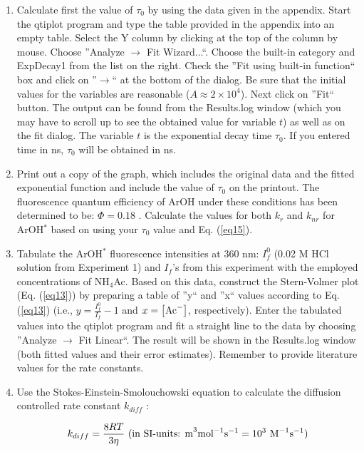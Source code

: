 \documentclass[byrevtex,amssymb,aps,pra,floatfix,letterpaper]{revtex4}
\begin{document}
\begin{enumerate}

\item Calculate first the value of $\tau_0$ by using the data given in the appendix. Start the qtiplot program and type the table provided in the appendix into an empty table. Select the Y column by clicking at the top of the column by mouse. Choose ''Analyze $\rightarrow$ Fit Wizard...``. Choose the built-in category and ExpDecay1 from the list on the right. Check the ''Fit using built-in function`` box and click on ''$\rightarrow$`` at the bottom of the dialog. Be sure that the initial values for the variables are reasonable ($A \approx 2\times 10^4$). Next click on ''Fit`` button. The output can be found from the Results.log window (which you may have to scroll up to see the obtained value for variable $t$) as well as on the fit dialog. The variable $t$ is the exponential decay time $\tau_0$. If you entered time in ns, $\tau_0$  will be obtained in ns.

\item Print out a copy of the graph, which includes the original data and the fitted exponential function and include the value of $\tau_0$ on the printout. The fluorescence quantum efficiency of ArOH under these conditions has been determined to be: $\Phi = 0.18$ \cite{MCBANE}. Calculate the values for both $k_r$ and $k_{nr}$ for ArOH$^*$ based on using your $\tau_0$ value and Eq. (\ref{eq15}).

\item Tabulate the ArOH$^*$ fluorescence intensities at 360 nm: $I_f^0$ (0.02 M HCl solution from Experiment 1) and $I_f$'s from this experiment with the employed concentrations of NH$_4$Ac. Based on this data, construct the Stern-Volmer plot (Eq. (\ref{eq13})) by preparing a table of ''y`` and ''x`` values according to Eq. (\ref{eq13}) (i.e., $y=\frac{I_f^0}{I_f}-1$ and $x=\left[\textnormal{Ac}^-\right]$, respectively). Enter the tabulated values into the qtiplot program and fit a straight line to the data by choosing ''Analyze $\rightarrow$ Fit Linear``. The result will be shown in the Results.log window (both fitted values and their error estimates). Remember to provide literature values for the rate constants.

\item Use the Stokes-Einstein-Smolouchowski equation to calculate the diffusion controlled rate constant $k_{diff}$ \cite{ATKINS1}:

\begin{equation}
k_{diff} = \frac{8RT}{3\eta}\textnormal{ (in SI-units: m}^3\textnormal{mol}^{-1}\textnormal{s}^{-1} = 10^3 \textnormal{ M}^{-1}\textnormal{s}^{-1}\textnormal{)}
\label{eq17}
\end{equation}


\end{enumerate}
\end{document}
